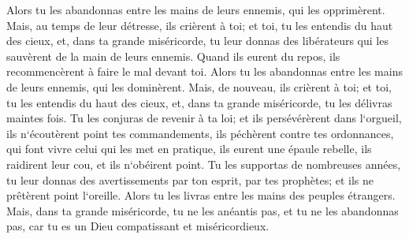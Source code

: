 \verse Alors tu les abandonnas entre les mains de leurs ennemis, qui les opprimèrent. Mais, au temps de leur détresse, ils crièrent à toi; et toi, tu les entendis du haut des cieux, et, dans ta grande miséricorde, tu leur donnas des libérateurs qui les sauvèrent de la main de leurs ennemis. 
\verse Quand ils eurent du repos, ils recommencèrent à faire le mal devant toi. Alors tu les abandonnas entre les mains de leurs ennemis, qui les dominèrent. Mais, de nouveau, ils crièrent à toi; et toi, tu les entendis du haut des cieux, et, dans ta grande miséricorde, tu les délivras maintes fois. 
\verse Tu les conjuras de revenir à ta loi; et ils persévérèrent dans l`orgueil, ils n`écoutèrent point tes commandements, ils péchèrent contre tes ordonnances, qui font vivre celui qui les met en pratique, ils eurent une épaule rebelle, ils raidirent leur cou, et ils n`obéirent point. 
\verse Tu les supportas de nombreuses années, tu leur donnas des avertissements par ton esprit, par tes prophètes; et ils ne prêtèrent point l`oreille. Alors tu les livras entre les mains des peuples étrangers. 
\verse Mais, dans ta grande miséricorde, tu ne les anéantis pas, et tu ne les abandonnas pas, car tu es un Dieu compatissant et miséricordieux. 

